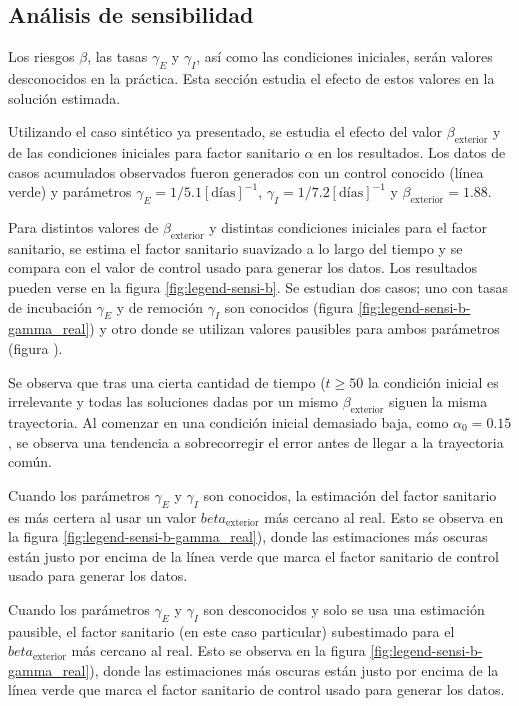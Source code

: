 \subsection{Análisis de sensibilidad}


Los riesgos \(\beta \), las tasas \(\gamma_E\) y \(\gamma_I\), así como las condiciones iniciales, serán valores desconocidos en la práctica. Esta sección estudia el efecto de estos valores en la solución estimada. 

Utilizando el caso sintético ya presentado, se estudia el efecto del valor \(\beta_{\text{exterior}}\) y de las condiciones iniciales para factor sanitario \(\alpha\) en los resultados. Los datos de casos acumulados observados fueron generados con un control conocido (línea verde) y parámetros \(\gamma_E = 1/5.1 [\text{días}]^{-1}\), \(\gamma_I = 1/7.2 [\text{días}]^{-1}\) y \(\beta_{\text{exterior}} = 1.88\).

Para distintos valores de \(\beta_{\text{exterior}}\) y distintas condiciones iniciales para el factor sanitario, se estima el factor sanitario suavizado a lo largo del tiempo y se compara con el valor de control usado para generar los datos. Los resultados pueden verse en la figura \ref{fig:legend-sensi-b}. Se estudian dos casos; uno con tasas de incubación \(\gamma_E\) y de remoción \(\gamma_I\) son conocidos (figura \ref{fig:legend-sensi-b-gamma_real}) y otro donde se utilizan valores pausibles para ambos parámetros (figura \label{fig:legend-sensi-b-gamma_estimado}).

Se observa que tras una cierta cantidad de tiempo (\(t \geq 50\) la condición inicial es irrelevante y todas las soluciones dadas por un mismo \(\beta_{\text{exterior}}\) siguen la misma trayectoria. Al comenzar en una condición inicial demasiado baja, como \(\alpha_0 = 0.15\), se observa una tendencia a sobrecorregir el error antes de llegar a la trayectoria común. 

Cuando los parámetros \(\gamma_E\) y \(\gamma_I\) son conocidos, la estimación del factor sanitario es más certera al usar un valor \(beta_{\text{exterior}}\) más cercano al real. Esto se observa en la figura \ref{fig:legend-sensi-b-gamma_real}), donde las estimaciones más oscuras están justo por encima de la línea verde que marca el factor sanitario de control usado para generar los datos.

Cuando los parámetros \(\gamma_E\) y \(\gamma_I\) son desconocidos y solo se usa una estimación pausible, el factor sanitario (en este caso particular) subestimado para el \(beta_{\text{exterior}}\) más cercano al real. Esto se observa en la figura \ref{fig:legend-sensi-b-gamma_real}), donde las estimaciones más oscuras están justo por encima de la línea verde que marca el factor sanitario de control usado para generar los datos.

